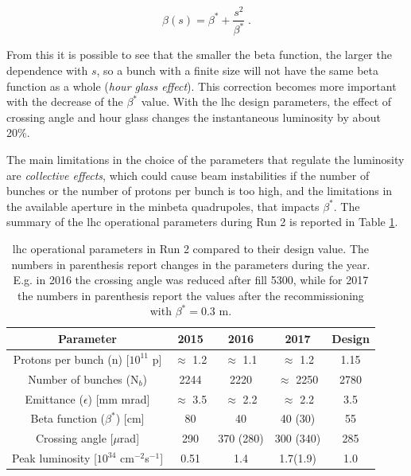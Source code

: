 \begin{equation}
\beta(s) = \beta^* + \frac{s^2}{\beta^*} \; .
\end{equation}

From this it is possible to see that the smaller the beta function, the larger the dependence with $s$, so a bunch with a finite size will not have the same beta function as a whole (\textit{hour glass effect}). This correction becomes more important with the decrease of the $\beta^*$ value. With the \gls{lhc} design parameters, the effect of crossing angle and hour glass changes the instantaneous luminosity by about 20\%.

The main limitations in the choice of the parameters that regulate the luminosity are \textit{collective effects}, which could cause beam instabilities if the number of bunches or the number of protons per bunch is too high, and the limitations in the available aperture in the minbeta quadrupoles, that impacts $\beta^*$. The summary of the \gls{lhc} operational parameters during Run 2 is reported in Table \ref{tab:lhc:param}.


\begin{table}[ht]
\begin{center}
\begin{tabular}{c c c c c }
\hline 
Parameter & 2015 & 2016 & 2017 & Design \\ 
\hline 
\hline
Protons per bunch (n) [$10^{11}$ p] & $\approx$ 1.2 & $\approx$ 1.1 & $\approx$ 1.2 & 1.15 \\ 
\hline 
Number of bunches (N$_b$) & 2244 & 2220 & $\approx$ 2250 & 2780 \\ 
\hline 
Emittance ($\epsilon$) [mm mrad] & $\approx$ 3.5 & $\approx$ 2.2 & $\approx$ 2.2 & 3.5 \\ 
\hline 
Beta function ($\beta^*$) [cm] & 80 & 40 & 40 (30) & 55 \\
\hline
Crossing angle [$\mu$rad] & 290 & 370 (280) & 300 (340) & 285 \\
\hline
Peak luminosity [$10^{34}$ cm$^{-2}$s$^{-1}$] & 0.51 & 1.4 & 1.7(1.9) & 1.0 \\
\hline
\end{tabular}
\end{center}
\caption{\gls{lhc} operational parameters in Run 2 compared to their design value.
The numbers in parenthesis report changes in the parameters during the year. 
E.g. in 2016 the crossing angle was reduced after fill 5300,
while for 2017 the numbers in parenthesis report the values 
after the recommissioning with $\beta^* = 0.3$ m.}
\label{tab:lhc:param}
\end{table}


